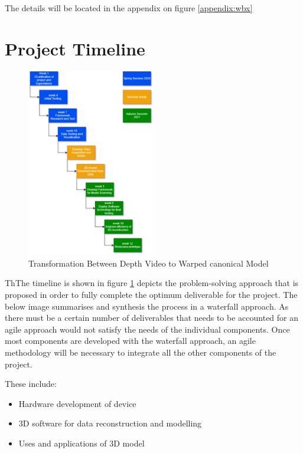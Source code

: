 \documentclass[12pt]{report}
\begin{document}
The details will be located in the appendix on figure \ref{appendix:wbx}
 
\section{Project Timeline}
\begin{figure} %
  \centering
  \includegraphics[width=0.5\textwidth]{timeline.png}
  \caption{Transformation Between Depth Video to Warped canonical Model}
  \label{Fig::timeline}
\end{figure}

ThThe timeline is shown in figure \ref{Fig::timeline} depicts the problem-solving approach that is proposed in order to fully complete the optimum deliverable for the project. 
The below image summarises and synthesis the process in a waterfall approach. As there must be a certain number of deliverables that needs to be accounted for an agile approach would not satisfy the needs of the individual components. 
Once most components are developed with the waterfall approach, an agile methodology will be necessary to integrate all the other components of the project.

These include:
\begin{itemize}
  \item Hardware development of device
  \item 3D software for data reconstruction and modelling 
  \item Uses and applications of 3D model
\end{itemize}
\end{document}
